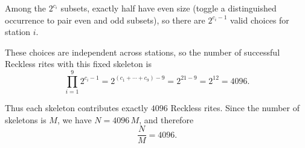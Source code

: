 Among the \(2^{c_i}\) subsets, exactly half have even size (toggle a distinguished occurrence to pair even and odd subsets),
so there are \(2^{c_i-1}\) valid choices for station \(i\).

These choices are independent across stations, so the number of successful Reckless rites with this fixed skeleton is
\[
\prod_{i=1}^9 2^{c_i-1}
=2^{(c_1+\cdots+c_9)-9}
=2^{21-9}
=2^{12}
=4096.
\]

Thus each skeleton contributes exactly \(4096\) Reckless rites. Since the number of skeletons is \(M\), we have \(N=4096\,M\), and therefore
\[
\frac{N}{M}=4096.
\]


\NextPage
